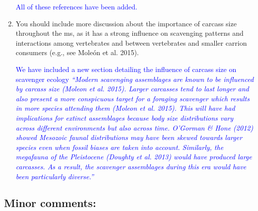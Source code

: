 \documentclass[12pt,letterpaper]{article}
\begin{document}
\begin{enumerate}
\textcolor{blue}{All of these references have been added.}

\item{You should include more discussion about the importance of carcass size throughout the ms, as it has a strong influence on scavenging patterns and interactions among vertebrates and between vertebrates and smaller carrion consumers (e.g., see Mole\'{o}n et al. 2015).}

\textcolor{blue}{We have included a new section detailing the influence of carcass size on scavenger ecology \textit{``Modern scavenging assemblages are known to be influenced by carcass size (Moleon et al. 2015). 
Larger carcasses tend to last longer and also present a more conspicuous target for a foraging scavenger which results in more species attending them (Moleon et al. 2015).
This will have had implications for extinct assemblages because body size distributions vary across different environments but also across time. 
O'Gorman \& Hone (2012) showed Mesozoic faunal distributions may have been skewed towards larger species even when fossil biases are taken into account. 
Similarly, the megafauna of the Pleistocene (Doughty et al. 2013) would have produced large carcasses. 
As a result, the scavenger assemblages during this era would have been particularly diverse.''}}

\end{enumerate}

\subsection{Minor comments:}
\end{document}
